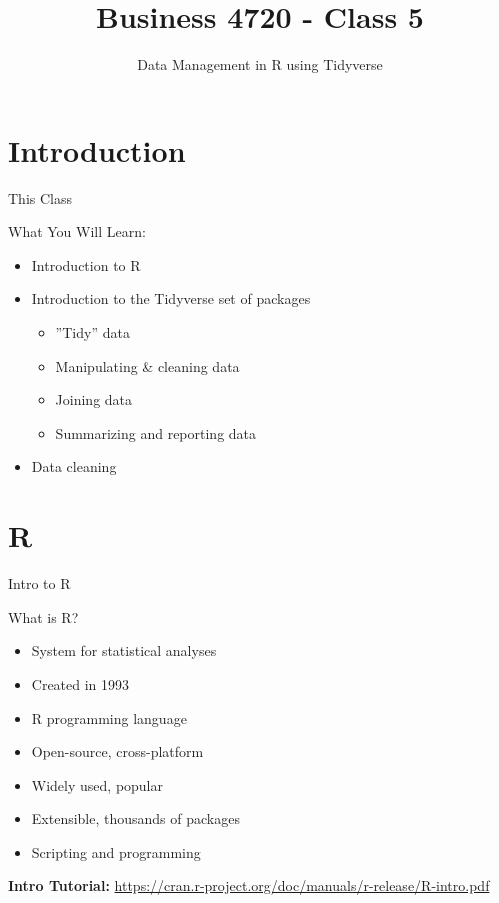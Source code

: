 \documentclass[ignorenonframetext,xcolor=x11names]{beamer}
\title{Business 4720 - Class 5}
\subtitle{Data Management in R using Tidyverse}
\begin{document}
\begin{frame}{}
  \titlepage
  \footnotesize
  
\end{frame}

\section{Introduction}

\begin{frame}{This Class}

\begin{block}{What You Will Learn:}
\begin{itemize}
  \item Introduction to R
  \item Introduction to the Tidyverse set of packages
  \begin{itemize}
  \item ''Tidy'' data
  \item Manipulating \& cleaning data
  \item Joining data
  \item Summarizing and reporting data
  \end{itemize}
  \item Data cleaning
\end{itemize}
\end{block}
\end{frame}

\section{R}

\begin{frame}{Intro to R}
\begin{block}{What is R?}
\begin{itemize}
  \item System for statistical analyses
  \item Created in 1993
  \item R programming language
  \item Open-source, cross-platform
  \item Widely used, popular
  \item Extensible, thousands of packages
  \item Scripting and programming
\end{itemize}  
\end{block}
\vspace{5mm}
\textbf{Intro Tutorial:}
\url{https://cran.r-project.org/doc/manuals/r-release/R-intro.pdf}
\end{frame}
\end{document}
